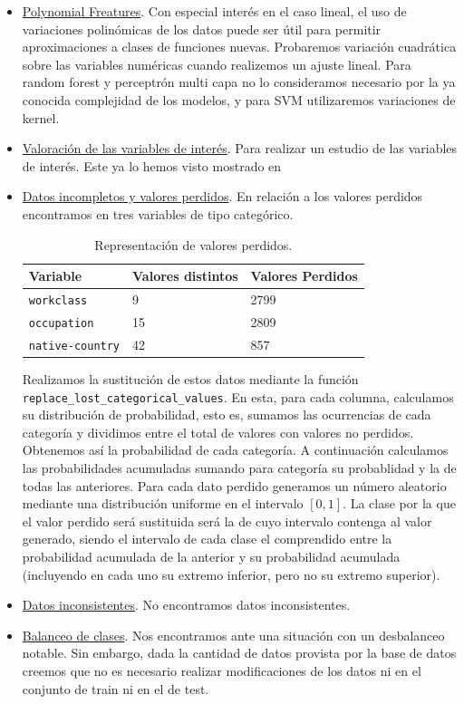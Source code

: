 \documentclass[11pt,a4paper]{article}
\begin{document}
\begin{itemize}
\begin{itemize}
\end{itemize}
\newpage
\item  \underline{Polynomial Freatures}. Con especial interés en el caso lineal, el uso de variaciones polinómicas de los datos puede ser útil para permitir aproximaciones a clases de funciones nuevas. Probaremos variación cuadrática sobre las variables numéricas cuando realizemos un ajuste lineal. Para random forest y perceptrón multi capa no lo consideramos necesario por la ya conocida complejidad de los modelos, y para SVM utilizaremos variaciones de kernel. \\
	
	\item \underline{Valoración de las variables de interés}. Para realizar un estudio de las variables de interés. Este ya lo hemos visto mostrado en 
	\item \underline{Datos incompletos y valores perdidos}. En relación a los valores perdidos encontramos en tres variables de tipo categórico.\\
	
\begin{table}[h]
\begin{center}
\begin{tabular}{|l|ll|}
\hline
Variable& Valores distintos & Valores Perdidos\\ \hline
\texttt{workclass} & 9 & 2799\\
\texttt{occupation} & 15 & 2809\\
\texttt{native-country} & 42 & 857\\\hline
\end{tabular}
\end{center}
\caption{Representación de valores perdidos.}
	\end{table}
	
	Realizamos la sustitución de estos datos mediante la función \texttt{replace\_lost\_categorical\_values}. En esta, para cada columna, calculamos su distribución de probabilidad, esto es, sumamos las ocurrencias de cada categoría y dividimos entre el total de valores con valores no perdidos. Obtenemos así la probabilidad de cada categoría. A continuación calculamos las probabilidades acumuladas sumando para categoría su probablidad y la de todas las anteriores. Para cada dato perdido generamos un número aleatorio mediante una distribución uniforme en el intervalo $[0,1]$. La clase por la que el valor perdido será sustituida será la de cuyo intervalo contenga al valor generado, siendo el intervalo de cada clase el comprendido entre la probabilidad acumulada de la anterior y su probabilidad acumulada (incluyendo en cada uno su extremo inferior, pero no su extremo superior).
	
	\item \underline{Datos inconsistentes}. No encontramos datos inconsistentes.
	\item \underline{Balanceo de clases}. Nos encontramos ante una situación con un desbalanceo notable. Sin embargo, dada la cantidad de datos provista por la base de datos creemos que no es necesario realizar modificaciones de los datos ni en el conjunto de train ni en el de test.
\end{itemize}
\end{document}
